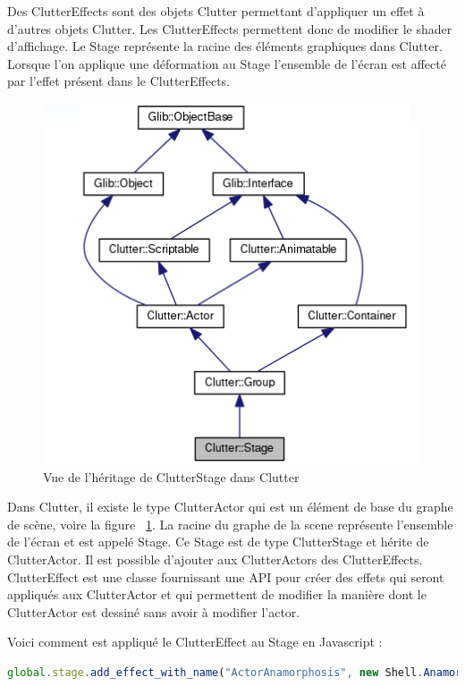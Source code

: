 Des ClutterEffects sont des objets Clutter permettant d'appliquer un effet à d'autres objets Clutter. Les ClutterEffects permettent donc de modifier le shader d'affichage. Le Stage représente la racine des éléments graphiques dans Clutter. Lorsque l'on applique une déformation au Stage l'ensemble de l’écran est affecté par l'effet présent dans le ClutterEffects. 

\begin{figure}[!h]
	\center	
	\includegraphics[scale=0.4]{image/clutterStage.png}
	\caption{Vue de l'héritage de ClutterStage dans Clutter}
	\label{fig:clutterStage}
\end{figure}

Dans Clutter, il existe le type ClutterActor qui est un élément de base du graphe de scène, voire la figure ~\ref{fig:clutterStage}. La racine du graphe de la scene représente l’ensemble de l’écran et est appelé Stage. Ce Stage est de type ClutterStage et hérite de ClutterActor. Il est possible d’ajouter aux ClutterActors des ClutterEffects. ClutterEffect est une classe fournissant une API pour créer des effets qui seront appliqués aux ClutterActor et qui permettent de modifier la manière dont le ClutterActor est dessiné sans avoir à modifier l’actor.

Voici comment est appliqué le ClutterEffect au Stage en Javascript :

\begin{lstlisting}[language=JavaScript]
global.stage.add_effect_with_name("ActorAnamorphosis", new Shell.AnamorphosisEffect());
\end{lstlisting}

